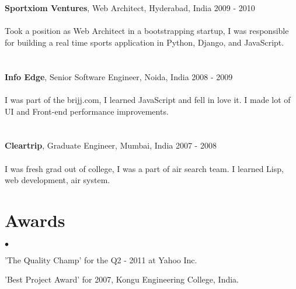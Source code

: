\documentclass[margin, line, 10pt]{res}
\newenvironment{list2}{
  \begin{list}{$\bullet$}{%
      \setlength{\itemsep}{0in}
      \setlength{\parsep}{0in} \setlength{\parskip}{0in}
      \setlength{\topsep}{0in} \setlength{\partopsep}{0in}
      \setlength{\leftmargin}{0.2in}}}{\end{list}}
\begin{document}
\begin{resume}
\section{}
{\Large {\bf Sportxiom Ventures}}, Web Architect, Hyderabad, India  \hfill 2009 - 2010\\
\vspace{-.3cm}\\
Took a position as Web Architect in a bootstrapping startup, I was responsible for building a real time sports application in Python, Django, and JavaScript.
\vspace{.05cm}

\section{}
{\Large {\bf Info Edge}}, Senior Software Engineer,  Noida, India \hfill 2008 - 2009 \\
\vspace{-.3cm}\\
I was part of the brijj.com, I learned JavaScript and fell in love it. I made lot of UI and Front-end performance improvements.
\vspace{.05cm}


\section{}
{\Large {\bf Cleartrip}}, Graduate Engineer,  Mumbai, India \hfill 2007 - 2008\\
\vspace{-.3cm}\\
I was fresh grad out of college, I was a part of air search team. I learned Lisp, web development, air system.
\vspace{.05cm}

\section{Awards}
\begin{list2}
\item 'The Quality Champ' for the Q2 - 2011 at Yahoo Inc.
\item 'Best Project Award' for 2007, Kongu Engineering College, India.
\end{list2}

\end{resume}
\end{document}
